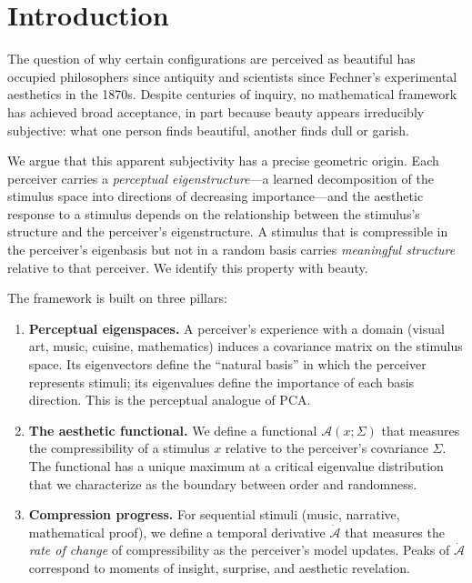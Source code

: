 \documentclass[journal]{IEEEtran}
\begin{document}
\section{Introduction}
\label{sec:intro}

The question of why certain configurations are perceived as beautiful
has occupied philosophers since antiquity and scientists since Fechner's
experimental aesthetics in the 1870s.  Despite centuries of inquiry, no
mathematical framework has achieved broad acceptance, in part because
beauty appears irreducibly subjective: what one person finds beautiful,
another finds dull or garish.

We argue that this apparent subjectivity has a precise geometric origin.
Each perceiver carries a \emph{perceptual eigenstructure}---a learned
decomposition of the stimulus space into directions of decreasing
importance---and the aesthetic response to a stimulus depends on the
relationship between the stimulus's structure and the perceiver's
eigenstructure.  A stimulus that is compressible in the perceiver's
eigenbasis but not in a random basis carries \emph{meaningful structure}
relative to that perceiver.  We identify this property with beauty.

The framework is built on three pillars:

\begin{enumerate}
    \item \textbf{Perceptual eigenspaces.}  A perceiver's experience
    with a domain (visual art, music, cuisine, mathematics) induces a
    covariance matrix on the stimulus space.  Its eigenvectors define
    the ``natural basis'' in which the perceiver represents stimuli;
    its eigenvalues define the importance of each basis direction.
    This is the perceptual analogue of PCA.

    \item \textbf{The aesthetic functional.}  We define a functional
    $\mathcal{A}(x; \Sigma)$ that measures the compressibility of a
    stimulus $x$ relative to the perceiver's covariance $\Sigma$.
    The functional has a unique maximum at a critical eigenvalue
    distribution that we characterize as the boundary between order
    and randomness.

    \item \textbf{Compression progress.}  For sequential stimuli
    (music, narrative, mathematical proof), we define a temporal
    derivative $\dot{\mathcal{A}}$ that measures the \emph{rate of
    change} of compressibility as the perceiver's model updates.
    Peaks of $\dot{\mathcal{A}}$ correspond to moments of insight,
    surprise, and aesthetic revelation.
\end{enumerate}
\end{document}
